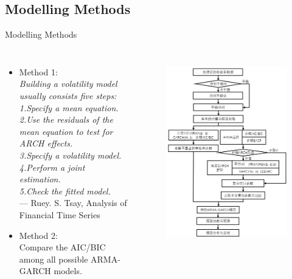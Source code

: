 \documentclass{beamer}
\begin{document}
\subsection{Modelling Methods}
\begin{frame}{Modelling Methods}
  \begin{columns} %
    \begin{itemize}
      \item Method 1:\\
      \emph{Building a volatility model usually consists five steps:\\
      1.Specify a mean equation.\\
      2.Use the residuals of the mean equation to test for ARCH effects.\\
      3.Specify a volatility model.\\
      4.Perform a joint estimation.\\
      5.Check the fitted model.}\\
      --- Ruey. S. Tsay, Analysis of Financial Time Series
      \item Method 2:\\
      Compare the AIC/BIC among all possible ARMA-GARCH models.
    \end{itemize}

    \begin{figure}[htp]
      \flushleft
        \includegraphics[width = .6\columnwidth]{fig/process.jpg}
        \label{fig:process_plot} 
    \end{figure}
  \end{columns}
\end{frame}
\end{document}
